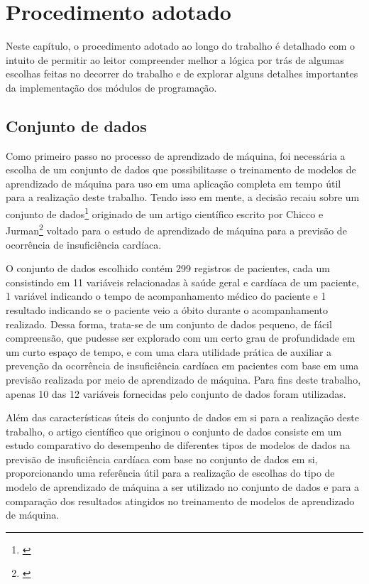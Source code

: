 \chapter{Procedimento adotado} \label{chap:procedimento_adotado}

Neste capítulo, o procedimento adotado ao longo do trabalho é detalhado com o intuito de permitir ao leitor compreender melhor a lógica por trás de algumas escolhas feitas no decorrer do trabalho e de explorar alguns detalhes importantes da implementação dos módulos de programação.

\section{Conjunto de dados}

Como primeiro passo no processo de aprendizado de máquina, foi necessária a escolha de um conjunto de dados que possibilitasse o treinamento de modelos de aprendizado de máquina para uso em uma aplicação completa em tempo útil para a realização deste trabalho. Tendo isso em mente, a decisão recaiu sobre um conjunto de dados\footnote{\cite{larxel_dataset}} originado de um artigo científico escrito por Chicco e Jurman\footnote{\cite{chicco2020}} voltado para o estudo de aprendizado de máquina para a previsão de ocorrência de insuficiência cardíaca.

O conjunto de dados escolhido contém 299 registros de pacientes, cada um consistindo em 11 variáveis relacionadas à saúde geral e cardíaca de um paciente, 1 variável indicando o tempo de acompanhamento médico do paciente e 1 resultado indicando se o paciente veio a óbito durante o acompanhamento realizado. Dessa forma, trata-se de um conjunto de dados pequeno, de fácil compreensão, que pudesse ser explorado com um certo grau de profundidade em um curto espaço de tempo, e com uma clara utilidade prática de auxiliar a prevenção da ocorrência de insuficiência cardíaca em pacientes com base em uma previsão realizada por meio de aprendizado de máquina. Para fins deste trabalho, apenas 10 das 12 variáveis fornecidas pelo conjunto de dados foram utilizadas.

Além das características úteis do conjunto de dados em si para a realização deste trabalho, o artigo científico que originou o conjunto de dados consiste em um estudo comparativo do desempenho de diferentes tipos de modelos de dados na previsão de insuficiência cardíaca com base no conjunto de dados em si, proporcionando uma referência útil para a realização de escolhas do tipo de modelo de aprendizado de máquina a ser utilizado no conjunto de dados e para a comparação dos resultados atingidos no treinamento de modelos de aprendizado de máquina.

